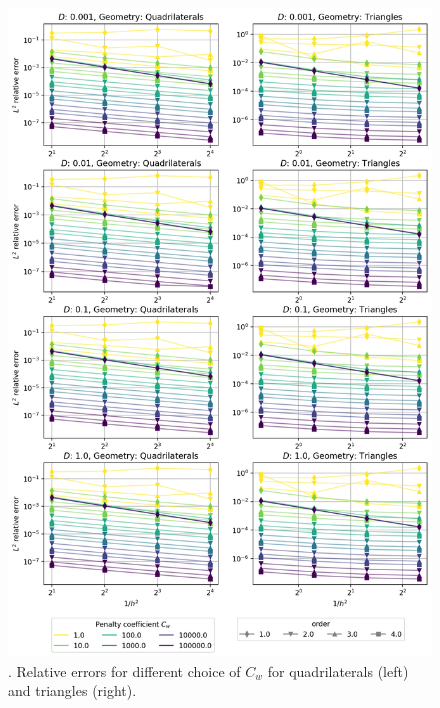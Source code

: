 \begin{figure}[p!]
	\centering
	\includegraphics[height=\textheight]{../figs/parametric/diffusion_2D/laplace.png}
	\caption{. Relative errors for different choice of $C_w$  for 
		quadrilaterals (left) and triangles (right).}
	\label{fig:conv_laplace}
\end{figure}